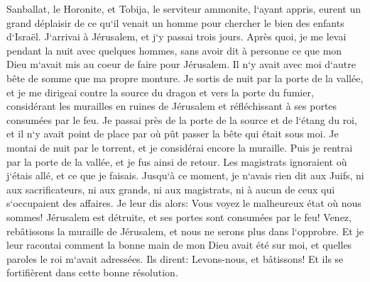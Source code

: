 \verse Sanballat, le Horonite, et Tobija, le serviteur ammonite, l`ayant appris, eurent un grand déplaisir de ce qu`il venait un homme pour chercher le bien des enfants d`Israël. 
\verse J`arrivai à Jérusalem, et j`y passai trois jours. 
\verse Après quoi, je me levai pendant la nuit avec quelques hommes, sans avoir dit à personne ce que mon Dieu m`avait mis au coeur de faire pour Jérusalem. Il n`y avait avec moi d`autre bête de somme que ma propre monture. 
\verse Je sortis de nuit par la porte de la vallée, et je me dirigeai contre la source du dragon et vers la porte du fumier, considérant les murailles en ruines de Jérusalem et réfléchissant à ses portes consumées par le feu. 
\verse Je passai près de la porte de la source et de l`étang du roi, et il n`y avait point de place par où pût passer la bête qui était sous moi. 
\verse Je montai de nuit par le torrent, et je considérai encore la muraille. Puis je rentrai par la porte de la vallée, et je fus ainsi de retour. 
\verse Les magistrats ignoraient où j`étais allé, et ce que je faisais. Jusqu`à ce moment, je n`avais rien dit aux Juifs, ni aux sacrificateurs, ni aux grands, ni aux magistrats, ni à aucun de ceux qui s`occupaient des affaires. 
\verse Je leur dis alors: Vous voyez le malheureux état où nous sommes! Jérusalem est détruite, et ses portes sont consumées par le feu! Venez, rebâtissons la muraille de Jérusalem, et nous ne serons plus dans l`opprobre. 
\verse Et je leur racontai comment la bonne main de mon Dieu avait été sur moi, et quelles paroles le roi m`avait adressées. Ils dirent: Levons-nous, et bâtissons! Et ils se fortifièrent dans cette bonne résolution. 
